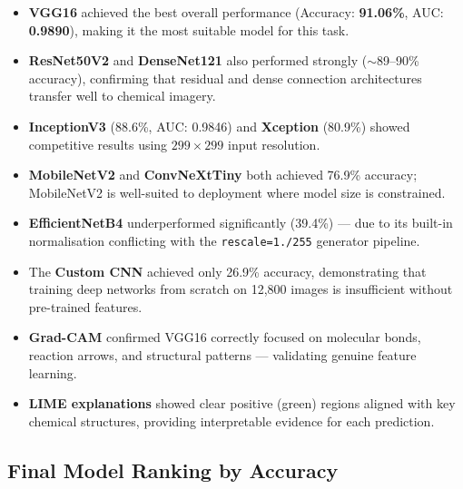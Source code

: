 \documentclass[12pt,a4paper]{article}
\newcommand{\code}[1]{\texttt{\small #1}}
\newcommand{\modelname}[1]{\textbf{#1}}
\begin{document}
\begin{itemize}[leftmargin=1.6em, itemsep=5pt]
  \item \modelname{VGG16} achieved the best overall performance (Accuracy: \textbf{91.06\%}, AUC: \textbf{0.9890}), making it the most suitable model for this task.
  \item \modelname{ResNet50V2} and \modelname{DenseNet121} also performed strongly ($\sim$89--90\% accuracy), confirming that residual and dense connection architectures transfer well to chemical imagery.
  \item \modelname{InceptionV3} (88.6\%, AUC: 0.9846) and \modelname{Xception} (80.9\%) showed competitive results using $299\times299$ input resolution.
  \item \modelname{MobileNetV2} and \modelname{ConvNeXtTiny} both achieved 76.9\% accuracy; MobileNetV2 is well-suited to deployment where model size is constrained.
  \item \modelname{EfficientNetB4} underperformed significantly (39.4\%) --- due to its built-in normalisation conflicting with the \code{rescale=1./255} generator pipeline.
  \item The \modelname{Custom CNN} achieved only 26.9\% accuracy, demonstrating that training deep networks from scratch on 12,800 images is insufficient without pre-trained features.
  \item \textbf{Grad-CAM} confirmed VGG16 correctly focused on molecular bonds, reaction arrows, and structural patterns --- validating genuine feature learning.
  \item \textbf{LIME explanations} showed clear positive (green) regions aligned with key chemical structures, providing interpretable evidence for each prediction.
\end{itemize}

\subsection{Final Model Ranking by Accuracy}
\end{document}

